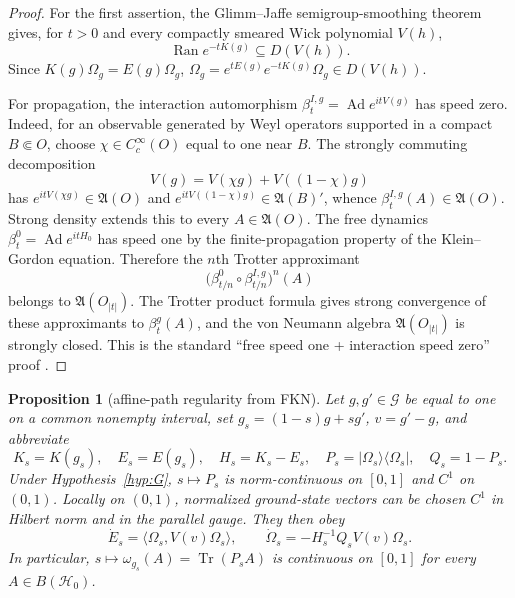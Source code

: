 \documentclass[11pt,a4paper]{article}
\newtheorem{proposition}[theorem]{Proposition}
\theoremstyle{remark}
\newcommand{\A}{\mathfrak A}
\newcommand{\G}{\mathcal G}
\newcommand{\Hh}{\mathcal H_0}
\newcommand{\Om}{\Omega}
\begin{document}
\begin{proof}
For the first assertion, the Glimm--Jaffe semigroup-smoothing theorem
\cite[Ch.~7, Thm.~7.3 and Lem.~7.4]{GJExp} gives, for $t>0$ and every
compactly smeared Wick polynomial $V(h)$,
\[
 \operatorname{Ran}e^{-tK(g)}\subseteq D(V(h)).
\]
Since $K(g)\Om_g=E(g)\Om_g$,
$\Om_g=e^{tE(g)}e^{-tK(g)}\Om_g\in D(V(h))$.

For propagation, the interaction automorphism
$\beta_t^{I,g}=\operatorname{Ad}e^{itV(g)}$ has speed zero.  Indeed, for an observable generated
by Weyl operators supported in a compact $B\Subset O$, choose $\chi\in C_c^\infty(O)$ equal to
one near $B$.  The strongly commuting decomposition
\[
 V(g)=V(\chi g)+V((1-\chi)g)
\]
has $e^{itV(\chi g)}\in\A(O)$ and
$e^{itV((1-\chi)g)}\in\A(B)'$, whence
$\beta_t^{I,g}(A)\in\A(O)$.  Strong density extends this to every $A\in\A(O)$.
The free dynamics $\beta_t^0=\operatorname{Ad}e^{itH_0}$ has speed one by the finite-propagation
property of the Klein--Gordon equation.  Therefore the $n$th Trotter approximant
\[
 \bigl(\beta_{t/n}^0\circ\beta_{t/n}^{I,g}\bigr)^n(A)
\]
belongs to $\A(O_{|t|})$.  The Trotter product formula gives strong convergence of these
approximants to $\beta_t^g(A)$, and the von Neumann algebra $\A(O_{|t|})$ is strongly closed.
This is the standard ``free speed one + interaction speed zero'' proof
\cite[Ch.~4, Prop.~4.1.1 and Thm.~4.1.2]{GJExp}.
\end{proof}

\begin{proposition}[affine-path regularity from FKN]\label{prop:FKNpath}
Let $g,g'\in\G$ be equal to one on a common nonempty interval, set
$g_s=(1-s)g+sg'$, $v=g'-g$, and abbreviate
\[
 K_s=K(g_s),\quad E_s=E(g_s),\quad H_s=K_s-E_s,\quad
 P_s=|\Om_s\rangle\langle\Om_s|,\quad Q_s=1-P_s.
\]
Under Hypothesis~\ref{hyp:G}, $s\mapsto P_s$ is norm-continuous on $[0,1]$ and $C^1$ on
$(0,1)$.  Locally on $(0,1)$, normalized ground-state vectors can be chosen $C^1$ in Hilbert norm
and in the parallel gauge.  They then obey
\begin{equation}\label{eq:FKNderivatives}
 \dot E_s=\langle\Om_s,V(v)\Om_s\rangle,
 \qquad
 \dot\Om_s=-H_s^{-1}Q_sV(v)\Om_s.                         \tag{FKN}
\end{equation}
In particular, $s\mapsto\omega_{g_s}(A)=\operatorname{Tr}(P_sA)$ is continuous on $[0,1]$ for
every $A\in B(\Hh)$.
\end{proposition}
\end{document}

